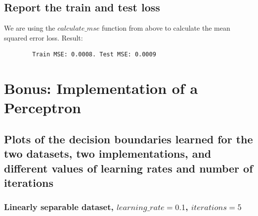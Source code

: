     \subsection{Report the train and test loss}
    We are using the $calculate\_mse$ function from above to calculate the mean squared error loss. Result:
    \begin{lstlisting}
        Train MSE: 0.0008. Test MSE: 0.0009
    \end{lstlisting}

    \pagebreak

    \section{Bonus: Implementation of a Perceptron}
    \subsection{ Plots of the decision boundaries learned for the two datasets, two implementations, and different values of learning rates and number of iterations}
    \subsubsection{Linearly separable dataset, $learning\_rate=0.1$, $iterations=5$}
    
